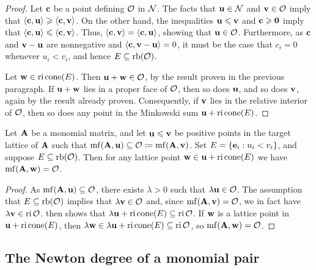 \documentclass{amsart}
\begin{document}
\begin{proof}
   Let $\mathbf{c}$ be a point defining $\mathcal{O}$ in $\mathcal{N}$.
   The facts that $\mathbf{u} \in \mathcal{N}$ and $\mathbf{v}\in \mathcal{O}$ imply that $\langle \mathbf{c}, \mathbf{u} \rangle \geqslant \langle \mathbf{c}, \mathbf{v} \rangle$.
   On the other hand, the inequalities $\mathbf{u} \leqslant \mathbf{v}$ and $\mathbf{c} \geqslant \mathbf{0}$ imply that $\langle \mathbf{c}, \mathbf{u} \rangle \leqslant \langle \mathbf{c}, \mathbf{v} \rangle$.
   Thus, $\langle \mathbf{c}, \mathbf{v} \rangle = \langle \mathbf{c}, \mathbf{u} \rangle$, showing that $\mathbf{u} \in \mathcal{O}$.
   Furthermore, as $\mathbf{c}$ and $\mathbf{v} - \mathbf{u}$ are nonnegative and $\langle \mathbf{c}, \mathbf{v}-\mathbf{u} \rangle = 0$, it must be the case that $c_i = 0$ whenever $u_i<v_i$, and hence $E\subseteq \operatorname{rb}(\mathcal{O})$.

   Let $\mathbf{w} \in \operatorname{ri}\operatorname{cone}(E)$.
   Then $\mathbf{u}+\mathbf{w} \in \mathcal{O}$, by the result proven in the previous paragraph.
   If $\mathbf{u}+\mathbf{w}$ lies in a proper face of $\mathcal{O}$, then so does $\mathbf{u}$, and so does $\mathbf{v}$, again by the result already proven.
   Consequently, if $\mathbf{v}$ lies in the relative interior of $\mathcal{O}$, then so does any point in the Minkowski sum $\mathbf{u} + \operatorname{ri} \operatorname{cone}(E)$.
\end{proof}

\begin{corollary}
   \label{cor: a property of minimal faces}
   Let $\mathbf{A}$ be a monomial matrix, and let $\mathbf{u} \leqslant \mathbf{v}$ be positive points in the target lattice of $\mathbf{A}$ such that $\operatorname{mf}(\mathbf{A},\mathbf{u}) \subseteq \mathcal{O} \coloneqq \operatorname{mf}(\mathbf{A},\mathbf{v})$.
   Set $E = \{\mathbf{e}_i : u_i < v_i\}$, and suppose $E\subseteq \operatorname{rb}(\mathcal{O})$.
   Then for any lattice point $\mathbf{w} \in \mathbf{u} + \operatorname{ri} \operatorname{cone}(E)$ we have $\operatorname{mf}(\mathbf{A},\mathbf{w}) = \mathcal{O}$.
\end{corollary}

\begin{proof}
   As $\operatorname{mf}(\mathbf{A},\mathbf{u}) \subseteq \mathcal{O}$, there exists $\lambda > 0$ such that $\lambda\mathbf{u} \in \mathcal{O}$.
   The assumption that $E \subseteq \operatorname{rb}(\mathcal{O})$ implies that $\lambda \mathbf{v} \in \mathcal{O}$ and, since $\operatorname{mf}(\mathbf{A},\mathbf{v}) = \mathcal{O}$, we in fact have $\lambda\mathbf{v} \in \operatorname{ri}\mathcal{O}$.
    then shows that $\lambda \mathbf{u} + \operatorname{ri}\operatorname{cone}(E) \subseteq \operatorname{ri}\mathcal{O}$.
   If $\mathbf{w}$ is a lattice point in $\mathbf{u} + \operatorname{ri}\operatorname{cone}(E)$, then $\lambda\mathbf{w} \in \lambda \mathbf{u} + \operatorname{ri}\operatorname{cone}(E) \subseteq \operatorname{ri}\mathcal{O}$, so $\operatorname{mf}(\mathbf{A},\mathbf{w}) = \mathcal{O}$.
\end{proof}

\subsection{The Newton degree of a monomial pair}
\end{document}
